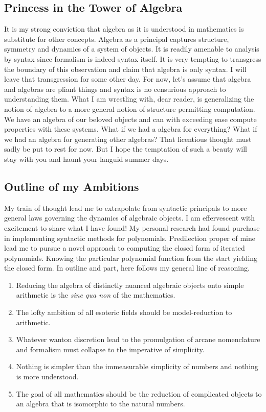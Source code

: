 \subsection{Princess in the Tower of Algebra}
It is my strong conviction that algebra as it is understood in mathematics is
substitute for other concepts. Algebra as a principal captures structure,
symmetry and dynamics of a system of objects. It is readily amenable to
analysis by syntax since formalism is indeed syntax itself. It is very tempting
to transgress the boundary of this observation and claim that algebra is only
syntax. I will leave that transgression for some other day. For now, let's
assume that algebra and algebras are pliant things and syntax is no censurious
approach to understanding them. What I am wrestling with, dear reader, is
generalizing the notion of algebra to a more general notion of structure
permitting computation. We have an algebra of our beloved objects and can with
exceeding ease compute properties with these systems. What if we had a algebra
for everything? What if we had an algebra for generating other algebras? That
licentious thought must sadly be put to rest for now. But I hope the temptation
of such a beauty will stay with you and haunt your languid summer days.

\subsection{Outline of my Ambitions}
My train of thought lead me to extrapolate from syntactic principals to more
general laws governing the dynamics of algebraic objects. I am effervescent
with excitement to share what I have found! My personal research had found
purchase in implementing syntactic methods for polynomials. Predilection proper
of mine lead me to pursue a novel approach to computing the closed form of
iterated polynomials. Knowing the particular polynomial function from the start
yielding the closed form. In outline and part, here follows my general line of
reasoning.

\begin{enumerate}
    \item Reducing the algebra of distinctly nuanced algebraic objects onto simple
          arithmetic is the \textit{sine qua non} of the mathematics.
    \item The lofty ambition of all esoteric fields should be model-reduction to
          arithmetic.
    \item Whatever wanton discretion lead to the promulgation of arcane nomenclature and
          formalism must collapse to the imperative of simplicity.
    \item Nothing is simpler than the immeasurable simplicity of numbers and nothing is
          more understood.
    \item The goal of all mathematics should be the reduction of complicated objects to
          an algebra that is isomorphic to the natural numbers.
\end{enumerate}

